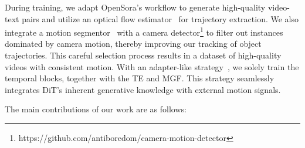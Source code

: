 During training, we adapt OpenSora's workflow to generate high-quality video-text pairs and utilize an optical flow estimator~\cite{DBLP:journals/pami/XuZCRYTG23} for trajectory extraction. We also integrate a motion segmentor~\cite{DBLP:conf/eccv/ZhaoLGWL22} with a camera detector\footnote{https://github.com/antiboredom/camera-motion-detector} to filter out instances dominated by camera motion, thereby improving our tracking of object trajectories. This careful selection process results in a dataset of high-quality videos with consistent motion. With an adapter-like strategy~\cite{DBLP:conf/aaai/MouWXW0QS24}, we solely train the temporal blocks, together with the TE and MGF. This strategy seamlessly integrates DiT's inherent generative knowledge with external motion signals.


The main contributions of our work are as follows:

